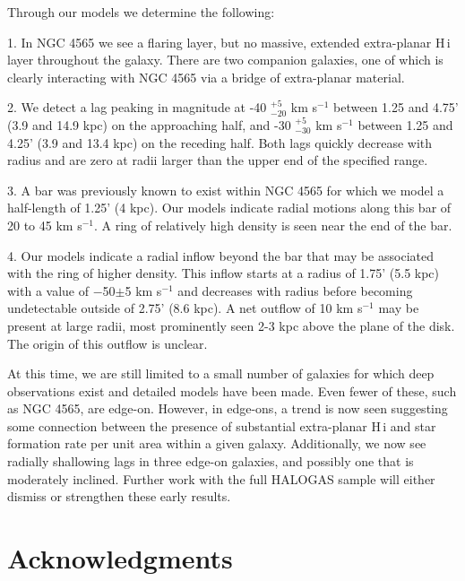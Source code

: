 \documentclass{emulateapj}
\begin{document}
\par
    Through our models we determine the following: 

\par
    1. In NGC 4565 we see a flaring layer, but no massive, extended extra-planar {\sc H\,i} layer throughout the galaxy.  There are two companion galaxies, one of which is clearly interacting with NGC 4565 via a bridge of extra-planar material.

\par 
    2.  We detect a lag peaking in magnitude at -40 $^{+5}_{-20}$ km s$^{-1}$ between 1.25 and 4.75' (3.9 and 14.9 kpc) on the approaching half, and -30 $^{+5}_{-30}$  km s$^{-1}$ between 1.25 and 4.25' (3.9 and 13.4 kpc) on the receding half.  Both lags quickly decrease with radius and are zero at radii larger than the upper end of the specified range.

\par
    3.  A bar was previously known to exist within NGC 4565 for which we model a half-length of 1.25' (4 kpc).  Our models indicate radial motions along this bar of 20 to 45 km s$^{-1}$.  A ring of relatively high density is seen near the end of the bar.

\par
    4.  Our models indicate a radial inflow beyond the bar that may be associated with the ring of higher density.  This inflow starts at a radius of 1.75' (5.5 kpc) with a value of $-$50$\pm$5 km s$^{-1}$ and decreases with radius before becoming undetectable outside of 2.75' (8.6 kpc).  A net outflow of 10 km s$^{-1}$ may be present at large radii, most prominently seen 2-3 kpc above the plane of the disk.  The origin of this outflow is unclear.


\par
   At this time, we are still limited to a small number of galaxies for which deep observations exist and detailed models have been made.  Even fewer of these, such as NGC 4565, are edge-on.  However, in edge-ons, a trend is now seen suggesting some connection between the presence of substantial extra-planar {\sc H\,i} and star formation rate per unit area within a given galaxy.  Additionally, we now see radially shallowing lags in three edge-on galaxies, and possibly one that is moderately inclined.  Further work with the full HALOGAS sample will either dismiss or strengthen these early results.  


\section{Acknowledgments} \label{Section8}
\end{document}
